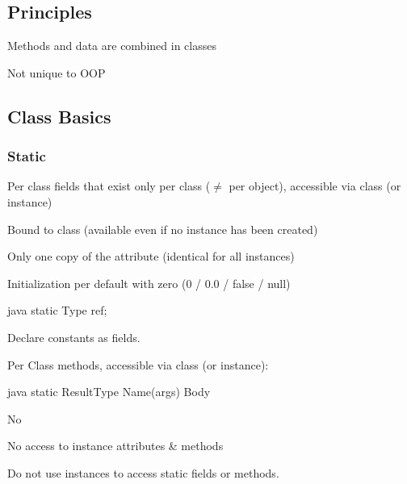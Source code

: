 \subsection{Principles}
\begin{defnbox}\nospacing
  \begin{defn}[Encapsulation]\label{defn:encapsulation}\leavevmode
    \begin{itemizenosep}
      \item Methods and data are combined in classes
      \item Not unique to OOP
    \end{itemizenosep}
  \end{defn}
\end{defnbox}
\subsection{Class Basics}
\subsubsection{Static}
\label{subsubsec:Static}
\begin{defnbox}\nospacing
  \begin{defn}\label{defn:staticFields}
    Per class fields that exist only per class ($\neq$ per object), accessible via class (or instance)
    \begin{itemizenosep}
        \item Bound to class (available even if no instance has been created)
        \item Only one copy of the attribute (identical for all instances)
        \item Initialization per default with zero (0 / 0.0 / false / null) 
    \end{itemizenosep}
    \begin{mintlinebox}{java}
      static Type ref;
    \end{mintlinebox}
  \end{defn}
\end{defnbox}
\begin{stylebox}[Constants]\nospacing
  Declare constants as  fields.
\end{stylebox}
\begin{defnbox}\nospacing
  \begin{defn}\label{defn:staticFields}
    Per Class methods, accessible via class (or instance):
    \begin{mintlinebox}{java}
      static ResultType Name(args){ Body }
    \end{mintlinebox}
    \begin{itemizenosep}
        \item No 
        \item No access to instance attributes \& methods
    \end{itemizenosep}
  \end{defn}
\end{defnbox}
\begin{stylebox}\nospacing
  Do not use instances to access static fields or methods.
\end{stylebox}
